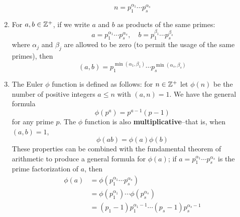 \documentclass[10pt, oneside]{article}
\begin{document}
\begin{enumerate}
    \[ n = p_1^{\alpha_1}\cdots p_s^{\alpha_s}\]
    \item For $a,b\in\mathbb{Z}^+$, if we write $a$ and $b$ as products of the same primes:
    \[ a = p_1^{\alpha_1} \cdots p_s^{\alpha_s},\quad b= p_1^{\beta_1}\cdots p_s^{\beta_s} \]
    where $\alpha_j$ and $\beta_j$ are allowed to be zero (to permit the usage of the same primes), then
    \[ (a,b) = p_1^{\min(\alpha_1,\beta_1)}\cdots p_s^{\min(\alpha_s,\beta_s)}\]
    \item The Euler $\phi$ function is defined as follows: for $n\in\mathbb{Z}^+$ let $\phi(n)$ be the number of positive integers $a\le n$ with $(a,n)=1$. We have the general formula
    \[ \phi(p^a) = p^{a-1}(p-1) \]
    for any prime $p$. The $\phi$ function is also \textbf{multiplicative}--that is, when $(a,b)=1$,
    \[ \phi(ab) = \phi(a)\phi(b)\]
    These properties can be combined with the fundamental theorem of arithmetic to produce a general formula for $\phi(a)$; if $a = p_1^{\alpha_1}\cdots p_s^{\alpha_s}$ is the prime factorization of $a$, then
    \begin{align*}
        \phi(a) &= \phi(p_1^{\alpha_1}\cdots p_s^{\alpha_s}) \\
        &= \phi(p_1^{\alpha_1})\cdots\phi(p_s^{\alpha_s}) \\
        &= (p_1-1)p_1^{\alpha_1-1}\cdots (p_s-1)p_s^{\alpha_s-1}
    \end{align*}
\end{enumerate}
\end{document}
